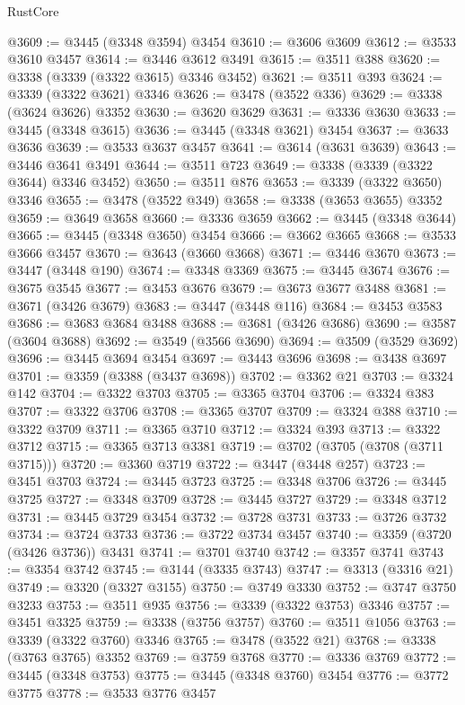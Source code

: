 \begin{lexlean}{RustCore}
\begin{coremodule}
@3609 := @3445 (@3348 @3594) @3454
@3610 := @3606 @3609
@3612 := @3533 @3610 @3457
@3614 := @3446 @3612 @3491
@3615 := @3511 @388
@3620 := @3338 (@3339 (@3322 @3615) @3346 @3452)
@3621 := @3511 @393
@3624 := @3339 (@3322 @3621) @3346
@3626 := @3478 (@3522 @336)
@3629 := @3338 (@3624 @3626) @3352
@3630 := @3620 @3629
@3631 := @3336 @3630
@3633 := @3445 (@3348 @3615)
@3636 := @3445 (@3348 @3621) @3454
@3637 := @3633 @3636
@3639 := @3533 @3637 @3457
@3641 := @3614 (@3631 @3639)
@3643 := @3446 @3641 @3491
@3644 := @3511 @723
@3649 := @3338 (@3339 (@3322 @3644) @3346 @3452)
@3650 := @3511 @876
@3653 := @3339 (@3322 @3650) @3346
@3655 := @3478 (@3522 @349)
@3658 := @3338 (@3653 @3655) @3352
@3659 := @3649 @3658
@3660 := @3336 @3659
@3662 := @3445 (@3348 @3644)
@3665 := @3445 (@3348 @3650) @3454
@3666 := @3662 @3665
@3668 := @3533 @3666 @3457
@3670 := @3643 (@3660 @3668)
@3671 := @3446 @3670
@3673 := @3447 (@3448 @190)
@3674 := @3348 @3369
@3675 := @3445 @3674
@3676 := @3675 @3545
@3677 := @3453 @3676
@3679 := @3673 @3677 @3488
@3681 := @3671 (@3426 @3679)
@3683 := @3447 (@3448 @116)
@3684 := @3453 @3583
@3686 := @3683 @3684 @3488
@3688 := @3681 (@3426 @3686)
@3690 := @3587 (@3604 @3688)
@3692 := @3549 (@3566 @3690)
@3694 := @3509 (@3529 @3692)
@3696 := @3445 @3694 @3454
@3697 := @3443 @3696
@3698 := @3438 @3697
@3701 := @3359 (@3388 (@3437 @3698))
@3702 := @3362 @21
@3703 := @3324 @142
@3704 := @3322 @3703
@3705 := @3365 @3704
@3706 := @3324 @383
@3707 := @3322 @3706
@3708 := @3365 @3707
@3709 := @3324 @388
@3710 := @3322 @3709
@3711 := @3365 @3710
@3712 := @3324 @393
@3713 := @3322 @3712
@3715 := @3365 @3713 @3381
@3719 := @3702 (@3705 (@3708 (@3711 @3715)))
@3720 := @3360 @3719
@3722 := @3447 (@3448 @257)
@3723 := @3451 @3703
@3724 := @3445 @3723
@3725 := @3348 @3706
@3726 := @3445 @3725
@3727 := @3348 @3709
@3728 := @3445 @3727
@3729 := @3348 @3712
@3731 := @3445 @3729 @3454
@3732 := @3728 @3731
@3733 := @3726 @3732
@3734 := @3724 @3733
@3736 := @3722 @3734 @3457
@3740 := @3359 (@3720 (@3426 @3736)) @3431
@3741 := @3701 @3740
@3742 := @3357 @3741
@3743 := @3354 @3742
@3745 := @3144 (@3335 @3743)
@3747 := @3313 (@3316 @21)
@3749 := @3320 (@3327 @3155)
@3750 := @3749 @3330
@3752 := @3747 @3750 @3233
@3753 := @3511 @935
@3756 := @3339 (@3322 @3753) @3346
@3757 := @3451 @3325
@3759 := @3338 (@3756 @3757)
@3760 := @3511 @1056
@3763 := @3339 (@3322 @3760) @3346
@3765 := @3478 (@3522 @21)
@3768 := @3338 (@3763 @3765) @3352
@3769 := @3759 @3768
@3770 := @3336 @3769
@3772 := @3445 (@3348 @3753)
@3775 := @3445 (@3348 @3760) @3454
@3776 := @3772 @3775
@3778 := @3533 @3776 @3457

\end{coremodule}
\end{lexlean}
